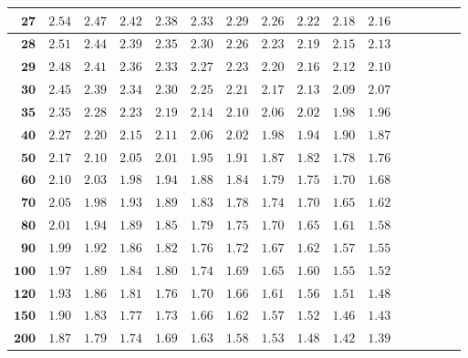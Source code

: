 \begin{alternateColorTable}
\begin{longtable}{|r|r|r|r|r|r|r|r|r|r|r|r|r|r|r|r|}
    \(\mathbf{27}\) & \(2.54\) & \(2.47\) & \(2.42\) & \(2.38\) & \(2.33\) & \(2.29\) & \(2.26\) & \(2.22\) & \(2.18\) & \(2.16\) \\  \hline 
    \(\mathbf{28}\) & \(2.51\) & \(2.44\) & \(2.39\) & \(2.35\) & \(2.30\) & \(2.26\) & \(2.23\) & \(2.19\) & \(2.15\) & \(2.13\) \\  \hline 
    \(\mathbf{29}\) & \(2.48\) & \(2.41\) & \(2.36\) & \(2.33\) & \(2.27\) & \(2.23\) & \(2.20\) & \(2.16\) & \(2.12\) & \(2.10\) \\  \hline 
    \(\mathbf{30}\) & \(2.45\) & \(2.39\) & \(2.34\) & \(2.30\) & \(2.25\) & \(2.21\) & \(2.17\) & \(2.13\) & \(2.09\) & \(2.07\) \\  \hline 
    \(\mathbf{35}\) & \(2.35\) & \(2.28\) & \(2.23\) & \(2.19\) & \(2.14\) & \(2.10\) & \(2.06\) & \(2.02\) & \(1.98\) & \(1.96\) \\  \hline 
    \(\mathbf{40}\) & \(2.27\) & \(2.20\) & \(2.15\) & \(2.11\) & \(2.06\) & \(2.02\) & \(1.98\) & \(1.94\) & \(1.90\) & \(1.87\) \\  \hline 
    \(\mathbf{50}\) & \(2.17\) & \(2.10\) & \(2.05\) & \(2.01\) & \(1.95\) & \(1.91\) & \(1.87\) & \(1.82\) & \(1.78\) & \(1.76\) \\  \hline 
    \(\mathbf{60}\) & \(2.10\) & \(2.03\) & \(1.98\) & \(1.94\) & \(1.88\) & \(1.84\) & \(1.79\) & \(1.75\) & \(1.70\) & \(1.68\) \\  \hline 
    \(\mathbf{70}\) & \(2.05\) & \(1.98\) & \(1.93\) & \(1.89\) & \(1.83\) & \(1.78\) & \(1.74\) & \(1.70\) & \(1.65\) & \(1.62\) \\  \hline 
    \(\mathbf{80}\) & \(2.01\) & \(1.94\) & \(1.89\) & \(1.85\) & \(1.79\) & \(1.75\) & \(1.70\) & \(1.65\) & \(1.61\) & \(1.58\) \\  \hline 
    \(\mathbf{90}\) & \(1.99\) & \(1.92\) & \(1.86\) & \(1.82\) & \(1.76\) & \(1.72\) & \(1.67\) & \(1.62\) & \(1.57\) & \(1.55\) \\  \hline 
    \(\mathbf{100}\) & \(1.97\) & \(1.89\) & \(1.84\) & \(1.80\) & \(1.74\) & \(1.69\) & \(1.65\) & \(1.60\) & \(1.55\) & \(1.52\) \\  \hline 
    \(\mathbf{120}\) & \(1.93\) & \(1.86\) & \(1.81\) & \(1.76\) & \(1.70\) & \(1.66\) & \(1.61\) & \(1.56\) & \(1.51\) & \(1.48\) \\  \hline 
    \(\mathbf{150}\) & \(1.90\) & \(1.83\) & \(1.77\) & \(1.73\) & \(1.66\) & \(1.62\) & \(1.57\) & \(1.52\) & \(1.46\) & \(1.43\) \\  \hline 
    \(\mathbf{200}\) & \(1.87\) & \(1.79\) & \(1.74\) & \(1.69\) & \(1.63\) & \(1.58\) & \(1.53\) & \(1.48\) & \(1.42\) & \(1.39\) \\  \hline 

\end{longtable}
\end{alternateColorTable}
